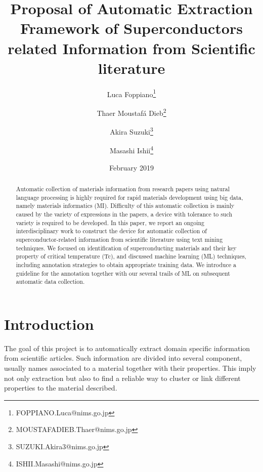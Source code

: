 \documentclass{article}
\title{Proposal of Automatic Extraction Framework of Superconductors related Information from Scientific literature}
\author[1]{Luca Foppiano\thanks{FOPPIANO.Luca@nims.go.jp}}
\author[1]{Thaer Moustafá Dieb\thanks{MOUSTAFADIEB.Thaer@nims.go.jp}}
\author[1]{Akira Suzuki\thanks{SUZUKI.Akira3@nims.go.jp}}
\author[1]{Masashi Ishii\thanks{ISHII.Masashi@nims.go.jp}}
\affil[1]{MaDIS, National Institute for Materials Science}
\date{February 2019}
\begin{document}
\maketitle

\begin{abstract}
Automatic collection of materials information from research papers using natural language processing is highly required for rapid materials development using big data, namely materials informatics (MI). Difficulty of this automatic collection is mainly caused by the variety of expressions in the papers, a device with tolerance to such variety is required to be developed. 
In this paper, we report an ongoing interdisciplinary work to construct the device for automatic collection of superconductor-related information from scientific literature using text mining techniques. We focused on identification of superconducting materials and their key property of critical temperature (Tc), and discussed machine learning (ML) techniques, including annotation strategies to obtain appropriate training data. We introduce a guideline for the annotation together with our several trails of ML on subsequent automatic data collection.


\end{abstract}

\pagebreak

\tableofcontents

\pagebreak

\section{Introduction}

The goal of this project is to automatically extract domain specific information from scientific articles. Such information are divided into several component, usually names associated to a material together with their properties. This imply not only extraction but also to find a reliable way to cluster or link different properties to the material described. 
\end{document}
